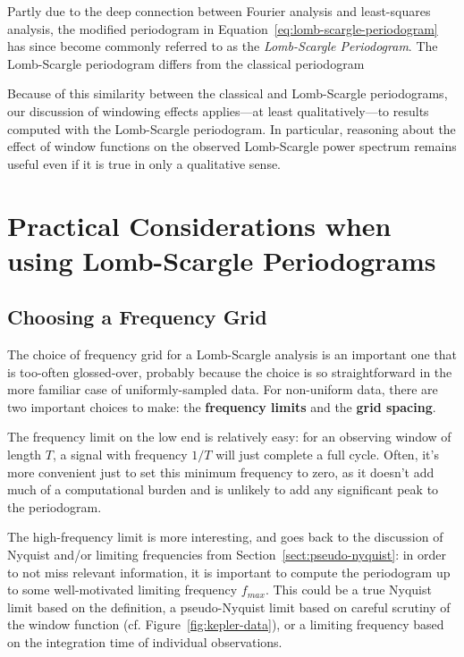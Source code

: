 \documentclass[preprint]{aastex}
\newcommand{\fig}[1]{Figure~\ref{fig:#1}}
\newcommand{\Eq}[1]{Equation~\ref{eq:#1}}
\newcommand{\eq}[1]{\Eq{#1}}
\newcommand{\Sect}[1]{Section~\ref{sect:#1}}
\newcommand{\sect}[1]{\Sect{#1}}
\newcommand{\sectlabel}[1]{\label{sect:#1}}
\begin{document}
Partly due to the deep connection between Fourier analysis and least-squares
analysis, the modified periodogram in \eq{lomb-scargle-periodogram}
has since become commonly referred to as the {\it Lomb-Scargle Periodogram}.
The Lomb-Scargle periodogram differs from the classical periodogram 

Because of this similarity between the classical and Lomb-Scargle periodograms,
our discussion of windowing effects applies---at least qualitatively---to
results computed with the Lomb-Scargle periodogram.
In particular, reasoning about the effect of window functions on the observed
Lomb-Scargle power spectrum remains useful even if it is true in only a
qualitative sense.


\section{Practical Considerations when using Lomb-Scargle Periodograms}
\sectlabel{practical-considerations}

\subsection{Choosing a Frequency Grid}
The choice of frequency grid for a Lomb-Scargle analysis is an important one
that is too-often glossed-over, probably because the choice is so
straightforward in the more familiar case of uniformly-sampled data.
For non-uniform data, there are two important choices to make: the
{\bf frequency limits} and the {\bf grid spacing}.

The frequency limit on the low end is relatively easy: for an observing window
of length $T$, a signal with frequency $1/T$ will just complete a full cycle.
Often, it's more convenient just to set this minimum frequency to zero, as it
doesn't add much of a computational burden and is unlikely to add any
significant peak to the periodogram.

The high-frequency limit is more interesting, and goes back to the discussion
of Nyquist and/or limiting frequencies from \sect{pseudo-nyquist}:
in order to not miss relevant information, it is important to compute the
periodogram up to some well-motivated limiting frequency $f_{max}$. This could
be a true Nyquist limit based on the \citep{Eyer99} definition, a pseudo-Nyquist
limit based on careful scrutiny of the window function (cf. \fig{kepler-data}),
or a limiting frequency based on the integration time of individual
observations.
\end{document}
